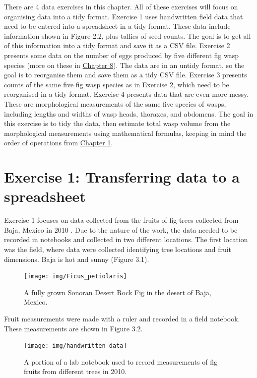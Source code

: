 \documentclass[
  openany]{scrbook}
\begin{document}
There are 4 data exercises in this chapter.
All of these exercises will focus on organising data into a tidy format.
Exercise 1 uses handwritten field data that need to be entered into a spreadsheet in a tidy format.
These data include information shown in Figure 2.2, plus tallies of seed counts.
The goal is to get all of this information into a tidy format and save it as a CSV file.
Exercise 2 presents some data on the number of eggs produced by five different fig wasp species (more on these in \protect\hyperlink{Chapter_8}{Chapter 8}).
The data are in an untidy format, so the goal is to reorganise them and save them as a tidy CSV file.
Exercise 3 presents counts of the same five fig wasp species as in Exercise 2, which need to be reorganised in a tidy format.
Exercise 4 presents data that are even more messy.
These are morphological measurements of the same five species of wasps, including lengths and widths of wasp heads, thoraxes, and abdomens.
The goal in this exercise is to tidy the data, then estimate total wasp volume from the morphological measurements using mathematical formulas, keeping in mind the order of operations from \protect\hyperlink{Chapter_1}{Chapter 1}.

\hypertarget{exercise-1-transferring-data-to-a-spreadsheet}{%
\section{Exercise 1: Transferring data to a spreadsheet}\label{exercise-1-transferring-data-to-a-spreadsheet}}

Exercise 1 focuses on data collected from the fruits of fig trees collected from Baja, Mexico in 2010 \citep{Duthie2015b, Duthie2016}.
Due to the nature of the work, the data needed to be recorded in notebooks and collected in two different locations.
The first location was the field, where data were collected identifying tree locations and fruit dimensions.
Baja is hot and sunny (Figure 3.1).

\begin{figure}
\texttt{[image: img/Ficus\_petiolaris]} \caption{A fully grown Sonoran Desert Rock Fig in the desert of Baja, Mexico.}\label{fig:unnamed-chunk-9}
\end{figure}

Fruit measurements were made with a ruler and recorded in a field notebook.
These measurements are shown in Figure 3.2.

\begin{figure}
\texttt{[image: img/handwritten\_data]} \caption{A portion of a lab notebook used to record measurements of fig fruits from different trees in 2010.}\label{fig:unnamed-chunk-10}
\end{figure}
\end{document}
